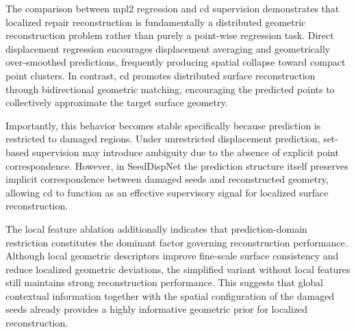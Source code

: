 The comparison between \ac{mpl2} regression and \ac{cd} supervision demonstrates that localized repair reconstruction is fundamentally a distributed geometric reconstruction problem rather than purely a point-wise regression task. Direct displacement regression encourages displacement averaging and geometrically over-smoothed predictions, frequently producing spatial collapse toward compact point clusters. In contrast, \ac{cd} promotes distributed surface reconstruction through bidirectional geometric matching, encouraging the predicted points to collectively approximate the target surface geometry.

Importantly, this behavior becomes stable specifically because prediction is restricted to damaged regions. Under unrestricted displacement prediction, set-based supervision may introduce ambiguity due to the absence of explicit point correspondence. However, in SeedDispNet the prediction structure itself preserves implicit correspondence between damaged seeds and reconstructed geometry, allowing \ac{cd} to function as an effective supervisory signal for localized surface reconstruction.

The local feature ablation additionally indicates that prediction-domain restriction constitutes the dominant factor governing reconstruction performance. Although local geometric descriptors improve fine-scale surface consistency and reduce localized geometric deviations, the simplified variant without local features still maintains strong reconstruction performance. This suggests that global contextual information together with the spatial configuration of the damaged seeds already provides a highly informative geometric prior for localized reconstruction.



